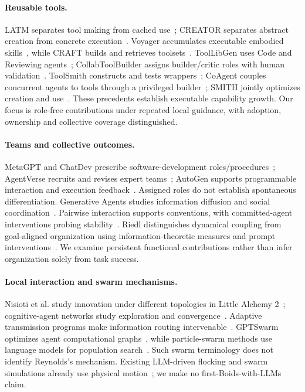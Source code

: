 \paragraph{Reusable tools.} LATM separates tool making from cached use~\cite{cai2024latm}; CREATOR separates abstract creation from concrete execution~\cite{qian2023creator}. Voyager accumulates executable embodied skills~\cite{wang2023voyager}, while CRAFT builds and retrieves toolsets~\cite{yuan2024craft}. ToolLibGen uses Code and Reviewing agents~\cite{yue2025toollibgen}; CollabToolBuilder assigns builder/critic roles with human validation~\cite{daull2025collabtoolbuilder}. ToolSmith constructs and tests wrappers~\cite{vakudavathu2026toolsmith}; CoAgent couples concurrent agents to tools through a privileged builder~\cite{lyu2026coagent}; SMITH jointly optimizes creation and use~\cite{tam2026smith}. These precedents establish executable capability growth. Our focus is role-free contributions under repeated local guidance, with adoption, ownership and collective coverage distinguished.

\paragraph{Teams and collective outcomes.} MetaGPT and ChatDev prescribe software-development roles/procedures~\cite{hong2024metagpt,qian2024chatdev}; AgentVerse recruits and revises expert teams~\cite{chen2024agentverse}; AutoGen supports programmable interaction and execution feedback~\cite{wu2024autogen}. Assigned roles do not establish spontaneous differentiation. Generative Agents studies information diffusion and social coordination~\cite{park2023generative}. Pairwise interaction supports conventions, with committed-agent interventions probing stability~\cite{ashery2025conventions}. Riedl distinguishes dynamical coupling from goal-aligned organization using information-theoretic measures and prompt interventions~\cite{riedl2026coordination}. We examine persistent functional contributions rather than infer organization solely from task success.

\paragraph{Local interaction and swarm mechanisms.} Nisioti et al. study innovation under different topologies in Little Alchemy 2~\cite{nisioti2024collective}; cognitive-agent networks study exploration and convergence~\cite{zomer2026collective}. Adaptive transmission programs make information routing intervenable~\cite{colas2026transmission}. GPTSwarm optimizes agent computational graphs~\cite{zhuge2024gptswarm}, while particle-swarm methods use language models for population search~\cite{shinohara2025lmpso}. Such swarm terminology does not identify Reynolds's mechanism. Existing LLM-driven flocking and swarm simulations already use physical motion~\cite{li2024flocking,jimenezromero2025swarm,rahman2025llmswarms}; we make no first-Boids-with-LLMs claim.

